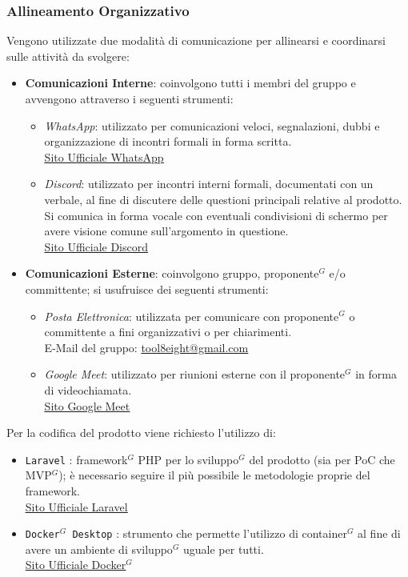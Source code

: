 \documentclass[a4paper,10pt]{article}
\begin{document}
\subsubsection{Allineamento Organizzativo}
Vengono utilizzate due modalità di comunicazione per allinearsi e coordinarsi sulle attività da svolgere:
  \begin{itemize}
    \item \textbf{Comunicazioni Interne}: coinvolgono tutti i membri del gruppo e avvengono attraverso i seguenti strumenti:
    \begin{itemize}
      \item \textit{WhatsApp}: utilizzato per comunicazioni veloci, segnalazioni, dubbi e organizzazione di incontri formali
      in forma scritta.\\
      \href{https://www.whatsapp.com/}{\underline{Sito Ufficiale WhatsApp}}
      \item \textit{Discord}: utilizzato per incontri interni formali, documentati con un verbale, al fine di discutere delle questioni
      principali relative al prodotto. Si comunica in forma vocale con eventuali condivisioni di schermo per avere visione 
      comune sull'argomento in questione.\\ 
      \href{https://discord.com/}{\underline{Sito Ufficiale Discord}}
    \end{itemize} 
    \item \textbf{Comunicazioni Esterne}: coinvolgono gruppo, proponente$^G$ e/o committente; si usufruisce dei seguenti strumenti:
    \begin{itemize}
      \item \textit{Posta Elettronica}: utilizzata per comunicare con proponente$^G$ o committente a fini organizzativi o per chiarimenti.\\
      E-Mail del gruppo: \url{tool8eight@gmail.com} 
      \item \textit{Google Meet}: utilizzato per riunioni esterne con il proponente$^G$ in forma di videochiamata.\\
      \href{https://meet.google.com/}{\underline{Sito Google Meet}} 
    \end{itemize} 
  \end{itemize}
Per la codifica del prodotto viene richiesto l'utilizzo di:
\begin{itemize}
  \item \texttt{Laravel} : framework$^G$ PHP per lo sviluppo$^G$ del prodotto (sia per PoC che MVP$^G$); è necessario
    seguire il più possibile le metodologie proprie del framework.\\
    \href{https://laravel.com/}{\underline{Sito Ufficiale Laravel}}
  \item \texttt{Docker$^G$ Desktop} : strumento che permette l'utilizzo di container$^G$ al fine di avere un ambiente di sviluppo$^G$
    uguale per tutti.\\
    \href{https://docker.com/}{\underline{Sito Ufficiale Docker$^G$}}  
\end{itemize}
\end{document}
